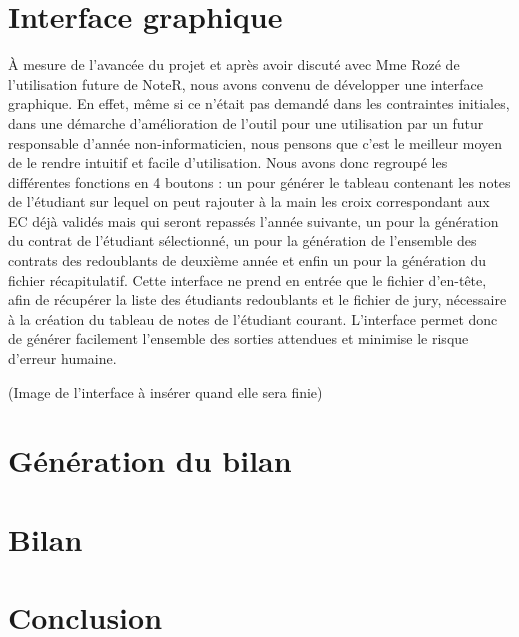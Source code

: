 \documentclass[a4paper,11pt]{article}
\begin{document}
\section{Interface graphique }	

   À mesure de l'avancée du projet et après avoir discuté avec Mme Rozé de l'utilisation future de NoteR, nous avons convenu de développer une interface graphique. En effet, même si ce n'était pas demandé dans les contraintes initiales, dans une démarche d'amélioration de l'outil pour une utilisation par un futur responsable d'année non-informaticien, nous pensons que c'est le meilleur moyen de le rendre intuitif et facile d'utilisation. Nous avons donc regroupé les différentes fonctions en 4 boutons : un pour générer le tableau contenant les notes de l'étudiant sur lequel on peut rajouter à la main les croix correspondant aux EC déjà validés mais qui seront repassés l'année suivante, un pour la génération du contrat de l'étudiant sélectionné, un pour la génération de l'ensemble des contrats des redoublants de deuxième année et enfin un pour la génération du fichier récapitulatif. Cette interface ne prend en entrée que le fichier d'en-tête, afin de récupérer la liste des étudiants redoublants et le fichier de jury, nécessaire à la création du tableau de notes de l'étudiant courant. L'interface permet donc de générer facilement l'ensemble des sorties attendues et minimise le risque d'erreur humaine.

    (Image de l'interface à insérer quand elle sera finie)

\section{Génération du bilan }
 

\section{Bilan }
  

\section*{Conclusion}
  


\end{document}
